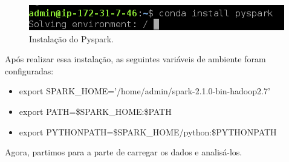 \documentclass{article}
\begin{document}
\begin{figure}[h]
  \includegraphics[width=\linewidth]{img/install_pyspark.png}
  \caption{Instalação do Pyspark.}
  \label{fig:pyspark_install}
\end{figure}

Após realizar essa instalação, as seguintes variáveis de ambiente foram configuradas:

\begin{itemize}
    \item export SPARK\_HOME='/home/admin/spark-2.1.0-bin-hadoop2.7'
    \item export PATH=\$SPARK\_HOME:\$PATH
    \item export PYTHONPATH=\$SPARK\_HOME/python:\$PYTHONPATH
\end{itemize}

Agora, partimos para a parte de carregar os dados e analisá-los.
\end{document}

